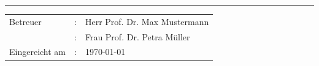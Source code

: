 {\begin{center}
\hrule %
\vspace{1cm} %
{\fontsize{12pt}{12} \selectfont %
    \begin{tabular}{lcl}
        Betreuer       &:& Herr Prof. Dr. Max Mustermann\\[0.5ex] %
                       &:& Frau Prof. Dr. Petra M\"uller\\[0.5ex] %
        Eingereicht am &:& \today %
    \end{tabular}
}

\end{center}
}
